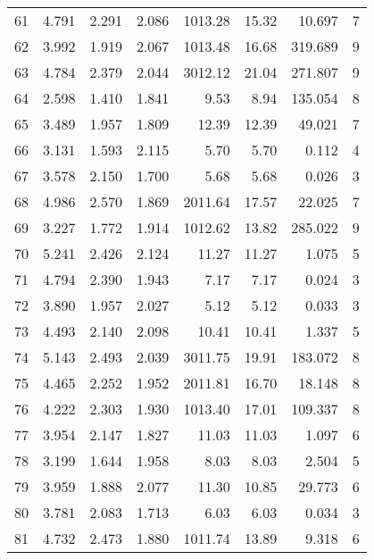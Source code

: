 \begin{tabular}{lrrrrrrr}
61 &     4.791 &      2.291 &      2.086 &  1013.28 &    15.32 &   10.697 &        7 \\
62 &     3.992 &      1.919 &      2.067 &  1013.48 &    16.68 &  319.689 &        9 \\
63 &     4.784 &      2.379 &      2.044 &  3012.12 &    21.04 &  271.807 &        9 \\
64 &     2.598 &      1.410 &      1.841 &     9.53 &     8.94 &  135.054 &        8 \\
65 &     3.489 &      1.957 &      1.809 &    12.39 &    12.39 &   49.021 &        7 \\
66 &     3.131 &      1.593 &      2.115 &     5.70 &     5.70 &    0.112 &        4 \\
67 &     3.578 &      2.150 &      1.700 &     5.68 &     5.68 &    0.026 &        3 \\
68 &     4.986 &      2.570 &      1.869 &  2011.64 &    17.57 &   22.025 &        7 \\
69 &     3.227 &      1.772 &      1.914 &  1012.62 &    13.82 &  285.022 &        9 \\
70 &     5.241 &      2.426 &      2.124 &    11.27 &    11.27 &    1.075 &        5 \\
71 &     4.794 &      2.390 &      1.943 &     7.17 &     7.17 &    0.024 &        3 \\
72 &     3.890 &      1.957 &      2.027 &     5.12 &     5.12 &    0.033 &        3 \\
73 &     4.493 &      2.140 &      2.098 &    10.41 &    10.41 &    1.337 &        5 \\
74 &     5.143 &      2.493 &      2.039 &  3011.75 &    19.91 &  183.072 &        8 \\
75 &     4.465 &      2.252 &      1.952 &  2011.81 &    16.70 &   18.148 &        8 \\
76 &     4.222 &      2.303 &      1.930 &  1013.40 &    17.01 &  109.337 &        8 \\
77 &     3.954 &      2.147 &      1.827 &    11.03 &    11.03 &    1.097 &        6 \\
78 &     3.199 &      1.644 &      1.958 &     8.03 &     8.03 &    2.504 &        5 \\
79 &     3.959 &      1.888 &      2.077 &    11.30 &    10.85 &   29.773 &        6 \\
80 &     3.781 &      2.083 &      1.713 &     6.03 &     6.03 &    0.034 &        3 \\
81 &     4.732 &      2.473 &      1.880 &  1011.74 &    13.89 &    9.318 &        6 \\

\end{tabular}
